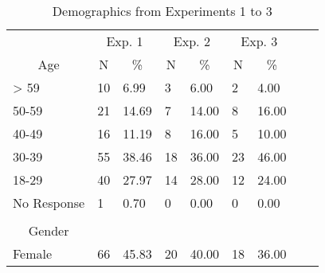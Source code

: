 \clearpage
\makeatletter
\efloat@restorefloats
\makeatother


\begin{appendix}
\section{}
\begin{table}[htbp]
\centering
\begin{threeparttable}
\caption{Demographics from Experiments 1 to 3}
\label{TR_table_4}
\begin{tabular}{llccccccc}
\toprule
& \multicolumn{2}{c}{Exp. 1} & \multicolumn{2}{c}{Exp. 2} & \multicolumn{2}{c}{Exp. 3} & \\
\cmidrule(rl){2-3}
\cmidrule(rl){4-5}
\cmidrule(rl){6-7}
\multicolumn{1}{c}{Age} & \multicolumn{1}{c}{N} & \multicolumn{1}{c}{\%} & \multicolumn{1}{c}{N} & \multicolumn{1}{c}{\%} & \multicolumn{1}{c}{N} & \multicolumn{1}{c}{\%}  \\
\midrule
\multicolumn{1}{l}{> 59} & \multicolumn{1}{l}{10} & \multicolumn{1}{l}{ 6.99} & \multicolumn{1}{l}{3} & \multicolumn{1}{l}{ 6.00} & \multicolumn{1}{l}{2} & \multicolumn{1}{l}{ 4.00} \\
\multicolumn{1}{l}{50-59} & \multicolumn{1}{l}{21} & \multicolumn{1}{l}{14.69} & \multicolumn{1}{l}{7} & \multicolumn{1}{l}{14.00} & \multicolumn{1}{l}{8} & \multicolumn{1}{l}{16.00} \\
\multicolumn{1}{l}{40-49} & \multicolumn{1}{l}{16} & \multicolumn{1}{l}{11.19} & \multicolumn{1}{l}{8} & \multicolumn{1}{l}{16.00} & \multicolumn{1}{l}{5} & \multicolumn{1}{l}{10.00} \\
\multicolumn{1}{l}{30-39} & \multicolumn{1}{l}{55} & \multicolumn{1}{l}{38.46} & \multicolumn{1}{l}{18} & \multicolumn{1}{l}{36.00} & \multicolumn{1}{l}{23} & \multicolumn{1}{l}{46.00} \\
\multicolumn{1}{l}{18-29} & \multicolumn{1}{l}{40} & \multicolumn{1}{l}{27.97} & \multicolumn{1}{l}{14} & \multicolumn{1}{l}{28.00} & \multicolumn{1}{l}{12} & \multicolumn{1}{l}{24.00} \\
\multicolumn{1}{l}{No Response} & \multicolumn{1}{l}{1} & \multicolumn{1}{l}{ 0.70} & \multicolumn{1}{l}{0} & \multicolumn{1}{l}{ 0.00} & \multicolumn{1}{l}{0} & \multicolumn{1}{l}{ 0.00} \\
& & & & & & & \\
\multicolumn{1}{c}{Gender} & & & & & & \\
\midrule
\multicolumn{1}{l}{Female} & \multicolumn{1}{l}{66} & \multicolumn{1}{l}{45.83} & \multicolumn{1}{l}{20} & \multicolumn{1}{l}{40.00} & \multicolumn{1}{l}{18} & \multicolumn{1}{l}{36.00} \\

\end{tabular}
\end{threeparttable}
\end{table}
\end{appendix}
